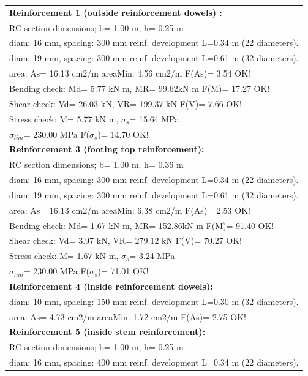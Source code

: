 \begin{center}
\begin{supertabular}[H]{|l|}
\hline
\textbf{Reinforcement 1 (outside reinforcement dowels) :} \\
  RC section dimensions; b= 1.00 m, h= 0.25 m\\
  diam: 16 mm, spacing: 300 mm  reinf. development L=0.34 m (22 diameters).\\
  diam: 19 mm, spacing: 300 mm  reinf. development L=0.61 m (32 diameters).\\
  area: As=  16.13 cm2/m areaMin:   4.56 cm2/m  F(As)= 3.54 OK!\\
  Bending check: Md=   5.77 kN m, MR=  99.62kN m  F(M)= 17.27 OK!\\
  Shear check: Vd=  26.03 kN,  VR= 199.37 kN  F(V)= 7.66 OK!\\
  Stress check: M=   5.77 kN m, $\sigma_s$=  15.64 MPa\\
    $\sigma_{lim}$= 230.00 MPa  F($\sigma_s$)= 14.70 OK!\\
\textbf{Reinforcement 3 (footing top reinforcement):}\\
  RC section dimensions; b= 1.00 m, h= 0.36 m\\
  diam: 16 mm, spacing: 300 mm  reinf. development L=0.34 m (22 diameters).\\
  diam: 19 mm, spacing: 300 mm  reinf. development L=0.61 m (32 diameters).\\
  area: As=  16.13 cm2/m areaMin:   6.38 cm2/m  F(As)= 2.53 OK!\\
  Bending check: Md=   1.67 kN m, MR= 152.86kN m  F(M)= 91.40 OK!\\
  Shear check: Vd=   3.97 kN,  VR= 279.12 kN  F(V)= 70.27 OK!\\
  Stress check: M=   1.67 kN m, $\sigma_s$=   3.24 MPa\\
    $\sigma_{lim}$= 230.00 MPa  F($\sigma_s$)= 71.01 OK!\\
\textbf{Reinforcement 4 (inside reinforcement dowels):}\\
  diam: 10 mm, spacing: 150 mm  reinf. development L=0.30 m (32 diameters).\\
  area: As=   4.73 cm2/m areaMin:   1.72 cm2/m  F(As)= 2.75 OK!\\
\textbf{Reinforcement 5 (inside stem reinforcement):}\\
  RC section dimensions; b= 1.00 m, h= 0.25 m\\
  diam: 16 mm, spacing: 400 mm  reinf. development L=0.34 m (22 diameters).\\

\end{supertabular}
\end{center}
